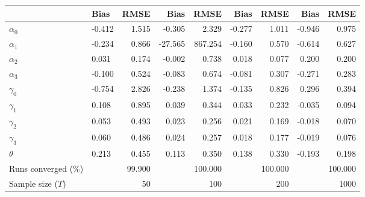 
\begin{tabular}[t]{llrrrrrrr}
\toprule
  & Bias & RMSE & Bias & RMSE & Bias & RMSE & Bias & RMSE\\
\midrule
$\alpha_{0}$ & -0.412 & 1.515 & -0.305 & 2.329 & -0.277 & 1.011 & -0.946 & 0.975\\
$\alpha_{1}$ & -0.234 & 0.866 & -27.565 & 867.254 & -0.160 & 0.570 & -0.614 & 0.627\\
$\alpha_{2}$ & 0.031 & 0.174 & -0.002 & 0.738 & 0.018 & 0.077 & 0.200 & 0.200\\
$\alpha_{3}$ & -0.100 & 0.524 & -0.083 & 0.674 & -0.081 & 0.307 & -0.271 & 0.283\\
$\gamma_{0}$ & -0.754 & 2.826 & -0.238 & 1.374 & -0.135 & 0.826 & 0.296 & 0.394\\
$\gamma_{1}$ & 0.108 & 0.895 & 0.039 & 0.344 & 0.033 & 0.232 & -0.035 & 0.094\\
$\gamma_{2}$ & 0.053 & 0.493 & 0.023 & 0.256 & 0.021 & 0.169 & -0.018 & 0.070\\
$\gamma_{3}$ & 0.060 & 0.486 & 0.024 & 0.257 & 0.018 & 0.177 & -0.019 & 0.076\\
$\theta$ & 0.213 & 0.455 & 0.113 & 0.350 & 0.138 & 0.330 & -0.193 & 0.198\\
Runs converged (\%) &  & 99.900 &  & 100.000 &  & 100.000 &  & 100.000\\
Sample size ($T$) &  & 50 &  & 100 &  & 200 &  & 1000\\
\bottomrule
\end{tabular}
